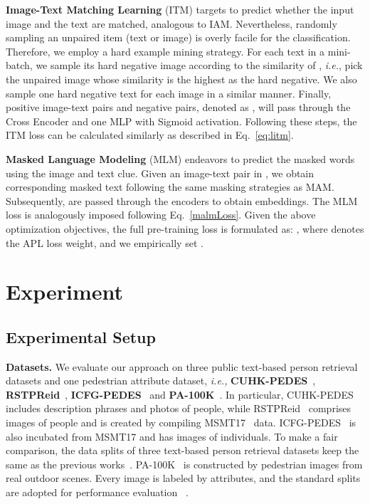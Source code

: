 \documentclass[sigconf]{acmart}
\def\ie{\emph{i.e.}}
\begin{document}
\noindent
\textbf{Image-Text Matching Learning}
(ITM) targets to predict whether the input image and the text are matched, analogous to IAM.
Nevertheless, randomly sampling an unpaired item (text or image) is overly facile for the classification. Therefore, we employ a hard example mining strategy.
For each text in a mini-batch, we sample its hard negative image according to the similarity of , \ie, pick the unpaired image whose similarity is the highest as the hard negative. 
We also sample one hard negative text for each image in a similar manner. 
Finally,  positive image-text pairs and  negative pairs, denoted as , will pass through the Cross Encoder and one MLP with Sigmoid activation. Following these steps, the ITM loss can be calculated similarly as described in Eq.~\ref{eq:litm}.


\noindent\textbf{Masked Language Modeling}
(MLM) endeavors to predict the masked words using the image and text clue. 
Given an image-text pair  in , we obtain corresponding masked text  following the same masking strategies as MAM. Subsequently,  are passed through the encoders to obtain embeddings. The MLM loss  is analogously imposed following Eq.~\ref{malmLoss}.
Given the above optimization objectives, the full pre-training loss is formulated as:
,
where  denotes the APL loss weight, and we empirically set .


\section{Experiment}


\subsection{Experimental Setup}


\textbf{Datasets.} 
We evaluate our approach on three public text-based person retrieval datasets and one  pedestrian attribute dataset,
\emph{i.e.,} \textbf{CUHK-PEDES}~\cite{li2017person},  \textbf{RSTPReid}~\cite{zhu2021dssl}, \textbf{ICFG-PEDES}~\cite{ding2021semantically} and \textbf{PA-100K}~\cite{liu2017hydraplus}. 
In particular, CUHK-PEDES~\cite{li2017person} includes  description phrases and  photos of  people, while RSTPReid~\cite{zhu2021dssl} comprises  images of  people and is created by compiling MSMT17~\cite{wei2018person} data. 
ICFG-PEDES~\cite{ding2021semantically} is also incubated from MSMT17 and has  images of  individuals. 
To make a fair comparison, the data splits of three text-based person retrieval datasets keep the same as the previous works~\cite{yan2022clip,farooq2022axm}.
PA-100K~\cite{liu2017hydraplus} is constructed by  pedestrian images from  real outdoor scenes.
Every image is labeled by  attributes, and the standard splits are adopted for performance evaluation ~\cite{liu2017hydraplus}.
\end{document}
